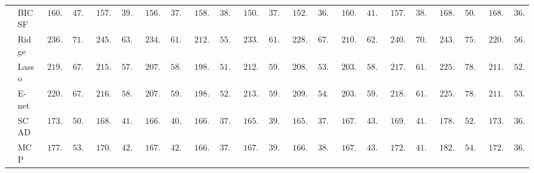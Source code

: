 \begin{tabular}{p{0.2cm}p{1cm}|p{0.6cm}p{0.6cm}|p{0.6cm}p{0.6cm}p{0.6cm}p{0.6cm}p{0.6cm}p{0.6cm}|p{0.6cm}p{0.6cm}p{0.6cm}p{0.6cm}p{0.6cm}p{0.6cm}|p{0.6cm}p{0.6cm}p{0.6cm}p{0.6cm}p{0.6cm}p{0.6cm}}
 & BIC SF  & $\phantom{0}160.28$ & $\phantom{0}47.80$ & $\phantom{0}157.92$ & $\phantom{0}39.84$ & $\phantom{0}156.21$ & $\phantom{0}37.86$ & $\phantom{0}158.46$ & $\phantom{0}38.22$ & $\phantom{0}150.95$ & $\phantom{0}37.50$ & $\phantom{0}152.74$ & $\phantom{0}36.09$ & $\phantom{0}160.07$ & $\phantom{0}41.69$ & $\phantom{0}157.70$ & $\phantom{0}38.14$ & $\phantom{0}168.31$ & $\phantom{0}50.20$ & $\phantom{0}168.01$ & $\phantom{0}36.15$ \\
 & Ridge  & $\phantom{0}236.39$ & $\phantom{0}71.11$ & $\phantom{0}245.92$ & $\phantom{0}63.77$ & $\phantom{0}234.33$ & $\phantom{0}61.97$ & $\phantom{0}212.63$ & $\phantom{0}55.06$ & $\phantom{0}233.19$ & $\phantom{0}61.55$ & $\phantom{0}228.80$ & $\phantom{0}67.01$ & $\phantom{0}210.68$ & $\phantom{0}62.71$ & $\phantom{0}240.48$ & $\phantom{0}70.19$ & $\phantom{0}243.75$ & $\phantom{0}75.28$ & $\phantom{0}220.75$ & $\phantom{0}56.96$ \\
 & Lasso  & $\phantom{0}219.31$ & $\phantom{0}67.40$ & $\phantom{0}215.23$ & $\phantom{0}57.57$ & $\phantom{0}207.41$ & $\phantom{0}58.68$ & $\phantom{0}198.75$ & $\phantom{0}51.87$ & $\phantom{0}212.52$ & $\phantom{0}59.28$ & $\phantom{0}208.33$ & $\phantom{0}53.31$ & $\phantom{0}203.37$ & $\phantom{0}58.90$ & $\phantom{0}217.55$ & $\phantom{0}61.69$ & $\phantom{0}225.77$ & $\phantom{0}78.23$ & $\phantom{0}211.06$ & $\phantom{0}52.44$ \\
 & E-net  & $\phantom{0}220.15$ & $\phantom{0}67.50$ & $\phantom{0}216.12$ & $\phantom{0}58.13$ & $\phantom{0}207.38$ & $\phantom{0}59.35$ & $\phantom{0}198.94$ & $\phantom{0}52.58$ & $\phantom{0}213.54$ & $\phantom{0}59.07$ & $\phantom{0}209.80$ & $\phantom{0}54.23$ & $\phantom{0}203.40$ & $\phantom{0}59.21$ & $\phantom{0}218.11$ & $\phantom{0}61.96$ & $\phantom{0}225.06$ & $\phantom{0}78.15$ & $\phantom{0}211.70$ & $\phantom{0}53.73$ \\
 & SCAD  & $\phantom{0}173.42$ & $\phantom{0}50.70$ & $\phantom{0}168.15$ & $\phantom{0}41.57$ & $\phantom{0}166.11$ & $\phantom{0}40.57$ & $\phantom{0}166.21$ & $\phantom{0}37.82$ & $\phantom{0}165.26$ & $\phantom{0}39.74$ & $\phantom{0}165.23$ & $\phantom{0}37.76$ & $\phantom{0}167.18$ & $\phantom{0}43.19$ & $\phantom{0}169.70$ & $\phantom{0}41.11$ & $\phantom{0}178.67$ & $\phantom{0}52.22$ & $\phantom{0}173.28$ & $\phantom{0}36.13$ \\
 & MCP  & $\phantom{0}177.09$ & $\phantom{0}53.88$ & $\phantom{0}170.15$ & $\phantom{0}42.07$ & $\phantom{0}167.56$ & $\phantom{0}42.45$ & $\phantom{0}166.07$ & $\phantom{0}37.64$ & $\phantom{0}167.40$ & $\phantom{0}39.93$ & $\phantom{0}166.84$ & $\phantom{0}38.09$ & $\phantom{0}167.22$ & $\phantom{0}43.58$ & $\phantom{0}172.20$ & $\phantom{0}41.83$ & $\phantom{0}182.04$ & $\phantom{0}54.34$ & $\phantom{0}172.09$ & $\phantom{0}36.03$ \\

\end{tabular}
